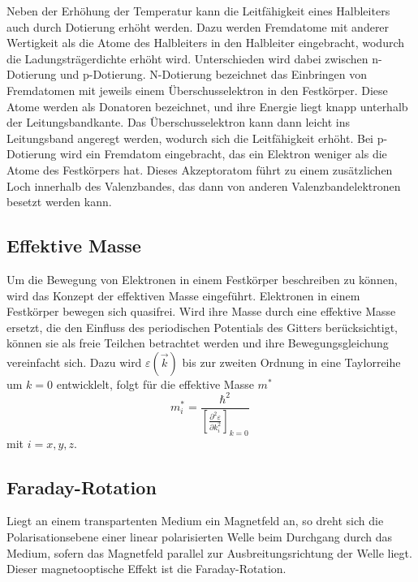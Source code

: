 Neben der Erhöhung der Temperatur kann die Leitfähigkeit eines Halbleiters auch durch Dotierung erhöht werden. Dazu 
werden Fremdatome mit anderer Wertigkeit als die Atome des Halbleiters in den Halbleiter eingebracht, wodurch die 
Ladungsträgerdichte erhöht wird. Unterschieden wird dabei zwischen n-Dotierung und p-Dotierung.
N-Dotierung bezeichnet das Einbringen von Fremdatomen mit jeweils einem Überschusselektron in den Festkörper. Diese Atome 
werden als Donatoren bezeichnet, und ihre Energie liegt knapp unterhalb der Leitungsbandkante. Das Überschusselektron 
kann dann leicht ins Leitungsband angeregt werden, wodurch sich die Leitfähigkeit erhöht. 
Bei p-Dotierung wird ein Fremdatom eingebracht, das ein Elektron weniger als die Atome des Festkörpers hat. Dieses Akzeptoratom
führt zu einem zusätzlichen Loch innerhalb des Valenzbandes, das dann von anderen Valenzbandelektronen besetzt werden kann.

\subsection{Effektive Masse}
Um die Bewegung von Elektronen in einem Festkörper beschreiben zu können, wird das Konzept der effektiven Masse eingeführt.
Elektronen in einem Festkörper bewegen sich quasifrei. Wird ihre Masse durch eine effektive Masse ersetzt, die den 
Einfluss des periodischen Potentials des Gitters berücksichtigt, können sie als freie Teilchen betrachtet werden und 
ihre Bewegungsgleichung vereinfacht sich. Dazu wird $\varepsilon(\vec{k})$ bis zur zweiten Ordnung in eine
Taylorreihe um $k = 0$ entwicklelt, folgt für die effektive Masse $m^{*}$
\begin{equation*}
    m^{*}_i = \frac{\hbar^2}{\left[\frac{\partial^2 \varepsilon}{\partial k_i^2}\right]_{k = 0}} \, 
\end{equation*}
mit $i = x, y, z$.

\subsection{Faraday-Rotation}
Liegt an einem transpartenten Medium ein Magnetfeld an, so dreht
sich die Polarisationsebene einer linear polarisierten Welle beim Durchgang durch das Medium, sofern das Magnetfeld
parallel zur Ausbreitungsrichtung der Welle liegt. Dieser magnetooptische Effekt ist die Faraday-Rotation.

